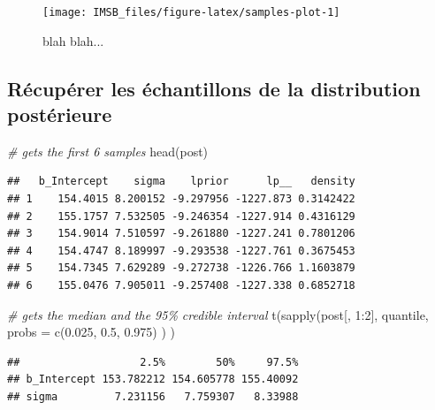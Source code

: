 \documentclass[
  a4paper,11pt,twoside,onecolumn,openright,final,oldfontcommands]{memoir}
\newenvironment{Shaded}{\begin{snugshade}}{\end{snugshade}}
\newcommand{\AttributeTok}[1]{\textcolor[rgb]{0.77,0.63,0.00}{#1}}
\newcommand{\CommentTok}[1]{\textcolor[rgb]{0.56,0.35,0.01}{\textit{#1}}}
\newcommand{\DecValTok}[1]{\textcolor[rgb]{0.00,0.00,0.81}{#1}}
\newcommand{\FloatTok}[1]{\textcolor[rgb]{0.00,0.00,0.81}{#1}}
\newcommand{\FunctionTok}[1]{\textcolor[rgb]{0.00,0.00,0.00}{#1}}
\newcommand{\NormalTok}[1]{#1}
\newcommand{\SpecialCharTok}[1]{\textcolor[rgb]{0.00,0.00,0.00}{#1}}
\theoremstyle{definition}
\theoremstyle{definition}
\theoremstyle{definition}
\theoremstyle{definition}
\theoremstyle{remark}
\begin{document}
\begin{figure}[!htb]

{\centering \texttt{[image: IMSB\_files/figure-latex/samples-plot-1]} 

}

\caption{blah blah...}\label{fig:samples-plot}
\end{figure}

\hypertarget{ruxe9cupuxe9rer-les-uxe9chantillons-de-la-distribution-postuxe9rieure}{%
\subsection{Récupérer les échantillons de la distribution postérieure}\label{ruxe9cupuxe9rer-les-uxe9chantillons-de-la-distribution-postuxe9rieure}}

\begin{Shaded}
\begin{Highlighting}[]
\CommentTok{\# gets the first 6 samples}
\FunctionTok{head}\NormalTok{(post)}
\end{Highlighting}
\end{Shaded}

\begin{verbatim}
##   b_Intercept    sigma    lprior      lp__   density
## 1    154.4015 8.200152 -9.297956 -1227.873 0.3142422
## 2    155.1757 7.532505 -9.246354 -1227.914 0.4316129
## 3    154.9014 7.510597 -9.261880 -1227.241 0.7801206
## 4    154.4747 8.189997 -9.293538 -1227.761 0.3675453
## 5    154.7345 7.629289 -9.272738 -1226.766 1.1603879
## 6    155.0476 7.905011 -9.257408 -1227.338 0.6852718
\end{verbatim}

\begin{Shaded}
\begin{Highlighting}[]
\CommentTok{\# gets the median and the 95\% credible interval}
\FunctionTok{t}\NormalTok{(}\FunctionTok{sapply}\NormalTok{(post[, }\DecValTok{1}\SpecialCharTok{:}\DecValTok{2}\NormalTok{], quantile, }\AttributeTok{probs =} \FunctionTok{c}\NormalTok{(}\FloatTok{0.025}\NormalTok{, }\FloatTok{0.5}\NormalTok{, }\FloatTok{0.975}\NormalTok{) ) )}
\end{Highlighting}
\end{Shaded}

\begin{verbatim}
##                   2.5%        50%     97.5%
## b_Intercept 153.782212 154.605778 155.40092
## sigma         7.231156   7.759307   8.33988
\end{verbatim}
\end{document}

